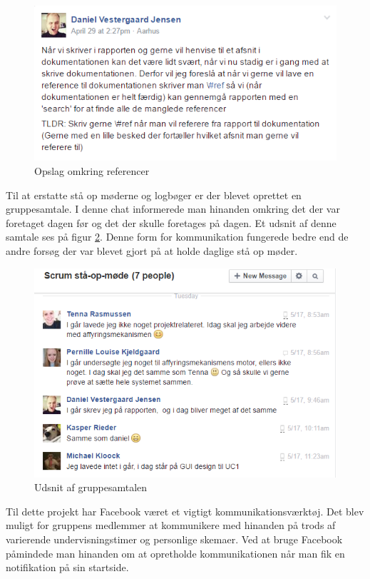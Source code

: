 \begin{figure}[H]
	\centering
	\includegraphics[scale=0.6]{Projektgennemfoerelse/images/fblatex}
	\caption{Opslag omkring referencer}
	\label{ref:fblatex}
\end{figure}

\noindent Til at erstatte stå op møderne og logbøger er der blevet oprettet en gruppesamtale. I denne chat informerede man hinanden omkring det der var foretaget dagen før og det der skulle foretages på dagen. Et udsnit af denne samtale ses på figur \ref{ref:fbchat}. Denne form for kommunikation fungerede bedre end de andre forsøg der var blevet gjort på at holde daglige stå op møder. 

\begin{figure}[H]
	\centering
	\includegraphics[scale=0.6]{Projektgennemfoerelse/images/fbstandup}
	\caption{Udsnit af gruppesamtalen}
	\label{ref:fbchat}
\end{figure}
\newpage
\noindent Til dette projekt har Facebook været et vigtigt kommunikationsværktøj. Det blev muligt for gruppens medlemmer at kommunikere med hinanden på trods af varierende undervisningstimer og personlige skemaer. Ved at bruge Facebook påmindede man hinanden om at opretholde kommunikationen når man fik en notifikation på sin startside.


